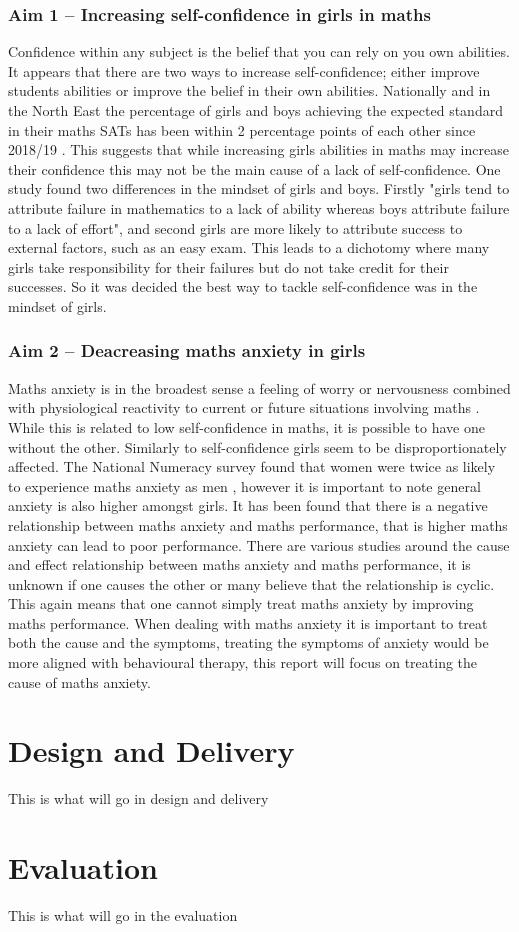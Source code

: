 \documentclass[11pt, a4paper, notitlepage]{article}
\begin{document}
\subsubsection{Aim 1 -- Increasing self-confidence in girls in maths} 
Confidence within any subject is the belief that you can rely on you own abilities. It appears that there are two ways to increase self-confidence; either improve students abilities or improve the belief in their own abilities. Nationally and in the North East the percentage of girls and boys achieving the expected standard in their maths SATs has been within 2 percentage points of each other since 2018/19 \cite{maths_SATs_stats}. This suggests that while increasing girls abilities in maths may increase their confidence this may not be the main cause of a lack of self-confidence. One study \cite{Georgiou01122007} found two differences in the mindset of girls and boys. Firstly "girls tend to attribute failure in mathematics to a lack of ability whereas boys attribute failure to a lack of effort", and second girls are more likely to attribute success to external factors, such as an easy exam. This leads to a dichotomy where many girls take responsibility for their failures but do not take credit for their successes. So it was decided the best way to tackle self-confidence was in the mindset of girls.
\subsubsection{Aim 2 -- Deacreasing maths anxiety in girls}
Maths anxiety is in the broadest sense a feeling of worry or nervousness combined with physiological reactivity to current or future situations involving maths \cite{Luttenberger:2018}. While this is related to low self-confidence in maths, it is possible to have one without the other. Similarly to self-confidence girls seem to be disproportionately affected. The National Numeracy survey found that women were twice as likely to experience maths anxiety as men \cite{NationalNumeracy_anxiety}, however it is important to note general anxiety is also higher amongst girls. It has been found that there is a negative relationship between maths anxiety and maths performance, that is higher maths anxiety can lead to poor performance. There are various studies around the cause and effect relationship between maths anxiety and maths performance, it is unknown if one causes the other or many believe that the relationship is cyclic. This again means that one cannot simply treat maths anxiety by improving maths performance. When dealing with maths anxiety it is important to treat both the cause and the symptoms, treating the symptoms of anxiety would be more aligned with behavioural therapy, this report will focus on treating the cause of maths anxiety.

\section{Design and Delivery}
This is what will go in design and delivery

\section{Evaluation}
This is what will go in the evaluation



\end{document}
